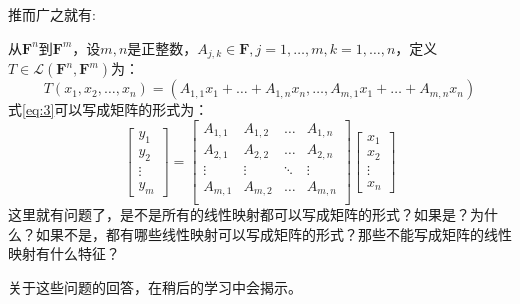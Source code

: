 \documentclass[10pt,a4paper,UTF8]{article}
\begin{document}
推而广之就有:
\begin{instance}
从\(\mathbf{F}^{n}\)到\(\mathbf{F}^{m}\)，设\(m,n\)是正整数，\(A_{j,k}\in \mathbf{F},j = 1,\ldots ,m,k=1,\ldots ,n\)，定义\(T\in \mathcal{L}(\mathbf{F}^{n}, \mathbf{F}^{m})\)为：
\begin{equation}
\label{eq:3}
T(x_{1},x_{2},\ldots ,x_{n}) = (A_{1,1}x_{1} + \ldots  + A_{1,n}x_{n}, \ldots , A_{m,1}x_{1} + \ldots + A_{m,n}x_{n})
\end{equation}
式\ref{eq:3}可以写成矩阵的形式为：
\begin{equation}
\label{eq:4}
\begin{bmatrix}
y_{1} \\ y_{2} \\ \vdots \\ y_{m}
\end{bmatrix}
=
\begin{bmatrix}
A_{1,1} & A_{1,2}  & \ldots & A_{1,n} \\
A_{2,1} & A_{2,2}  & \ldots & A_{2,n} \\
\vdots & \vdots  & \ddots & \vdots \\
A_{m,1} & A_{m,2}  & \ldots & A_{m,n} \\
\end{bmatrix}
\begin{bmatrix}
x_{1} \\ x_{2} \\ \vdots \\ x_{n}
\end{bmatrix}
\end{equation}
这里就有问题了，是不是所有的线性映射都可以写成矩阵的形式？如果是？为什么？如果不是，都有哪些线性映射可以写成矩阵的形式？那些不能写成矩阵的线性映射有什么特征？

关于这些问题的回答，在稍后的学习中会揭示。
\end{instance}
\end{document}
